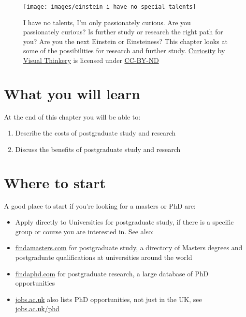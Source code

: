 \documentclass[
]{book}
\providecommand{\tightlist}{%
  \setlength{\itemsep}{0pt}\setlength{\parskip}{0pt}}
\begin{document}
\begin{figure}

{\centering \texttt{[image: images/einstein-i-have-no-special-talents]} 

}

\caption{I have no talents, I'm only passionately curious. Are you passionately curious? Is further study or research the right path for you? Are you the next Einstein or Einsteiness? This chapter looks at some of the possibilities for research and further study. \href{https://bryanmmathers.com/curiosity/}{Curiosity} by \href{https://visualthinkery.com/}{Visual Thinkery} is licensed under \href{https://creativecommons.org/licenses/by-nd/4.0/}{CC-BY-ND}}\label{fig:einstein-fig}
\end{figure}



\hypertarget{ilo12}{%
\section{What you will learn}\label{ilo12}}

At the end of this chapter you will be able to:

\begin{enumerate}
\def\labelenumi{\arabic{enumi}.}
\tightlist
\item
  Describe the costs of postgraduate study and research
\item
  Discuss the benefits of postgraduate study and research
\end{enumerate}

\hypertarget{finda}{%
\section{Where to start}\label{finda}}

A good place to start if you're looking for a masters or PhD are:

\begin{itemize}
\tightlist
\item
  Apply directly to Universities for postgraduate study, if there is a specific group or course you are interested in. See also:
\item
  \href{https://www.findamasters.com/}{findamasters.com} for postgraduate study, a directory of Masters degrees and postgraduate qualifications at universities around the world
\item
  \href{https://www.findaphd.com/}{findaphd.com} for postgraduate research, a large database of PhD opportunities
\item
  \href{https://www.jobs.ac.uk/}{jobs.ac.uk} also lists PhD opportunities, not just in the UK, see \href{https://www.jobs.ac.uk/phd}{jobs.ac.uk/phd}
\end{itemize}
\end{document}
